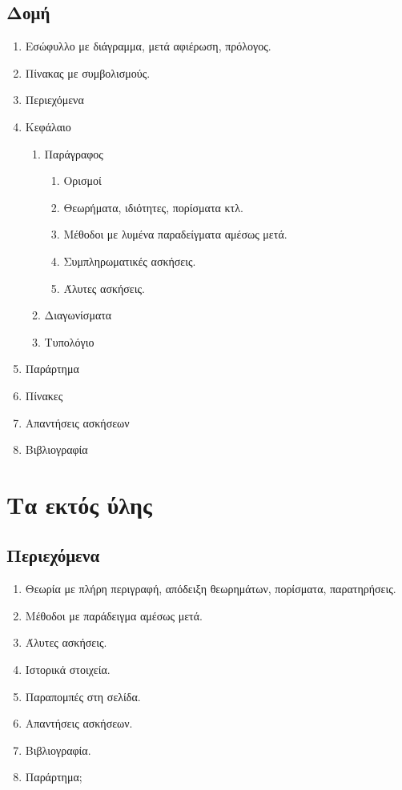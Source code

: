 \documentclass[11pt,a4paper]{book}
\begin{document}
\subsection{Δομή}
\begin{enumerate}
\item Εσώφυλλο με διάγραμμα, μετά αφιέρωση, πρόλογος.
\item Πίνακας με συμβολισμούς.
\item Περιεχόμενα
\item Κεφάλαιο
\begin{enumerate}
\item Παράγραφος
\begin{enumerate}
\item Ορισμοί
\item Θεωρήματα, ιδιότητες, πορίσματα κτλ.
\item Μέθοδοι με λυμένα παραδείγματα αμέσως μετά.
\item Συμπληρωματικές ασκήσεις.
\item Άλυτες ασκήσεις.
\end{enumerate}
\item Διαγωνίσματα
\item Τυπολόγιο
\end{enumerate}
\item Παράρτημα
\item Πίνακες
\item Απαντήσεις ασκήσεων
\item Βιβλιογραφία
\end{enumerate}
\section{Τα εκτός ύλης}
\subsection{Περιεχόμενα}
\begin{enumerate}
\item Θεωρία με πλήρη περιγραφή, απόδειξη θεωρημάτων, πορίσματα, παρατηρήσεις.
\item Μέθοδοι με παράδειγμα αμέσως μετά.
\item Άλυτες ασκήσεις.
\item Ιστορικά στοιχεία.
\item Παραπομπές στη σελίδα.
\item Απαντήσεις ασκήσεων.
\item Βιβλιογραφία.
\item Παράρτημα;
\end{enumerate}
\end{document}
